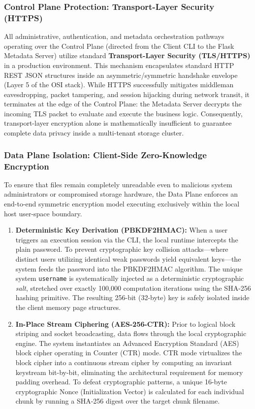 \subsubsection{Control Plane Protection: Transport-Layer Security (HTTPS)}
All administrative, authentication, and metadata orchestration pathways operating over the Control Plane (directed from the Client CLI to the Flask Metadata Server) utilize standard \textbf{Transport-Layer Security (TLS/HTTPS)} in a production environment. This mechanism encapsulates standard HTTP REST JSON structures inside an asymmetric/symmetric handshake envelope (Layer 5 of the OSI stack). While HTTPS successfully mitigates middleman eavesdropping, packet tampering, and session hijacking during network transit, it terminates at the edge of the Control Plane: the Metadata Server decrypts the incoming TLS packet to evaluate and execute the business logic. Consequently, transport-layer encryption alone is mathematically insufficient to guarantee complete data privacy inside a multi-tenant storage cluster.

\subsubsection{Data Plane Isolation: Client-Side Zero-Knowledge Encryption}
To ensure that files remain completely unreadable even to malicious system administrators or compromised storage hardware, the Data Plane enforces an end-to-end symmetric encryption model executing exclusively within the local host user-space boundary.
\begin{enumerate}
    \item \textbf{Deterministic Key Derivation (PBKDF2HMAC):} When a user triggers an execution session via the CLI, the local runtime intercepts the plain password. To prevent cryptographic key collision attacks—where distinct users utilizing identical weak passwords yield equivalent keys—the system feeds the password into the PBKDF2HMAC algorithm. The unique system \texttt{username} is systematically injected as a deterministic cryptographic \textit{salt}, stretched over exactly 100,000 computation iterations using the SHA-256 hashing primitive. The resulting 256-bit (32-byte) key is safely isolated inside the client memory page structures.
    \item \textbf{In-Place Stream Ciphering (AES-256-CTR):} Prior to logical block striping and socket broadcasting, data flows through the local cryptographic engine. The system instantiates an Advanced Encryption Standard (AES) block cipher operating in Counter (CTR) mode. CTR mode virtualizes the block cipher into a continuous stream cipher by computing an invariant keystream bit-by-bit, eliminating the architectural requirement for memory padding overhead. To defeat cryptographic patterns, a unique 16-byte cryptographic Nonce (Initialization Vector) is calculated for each individual chunk by running a SHA-256 digest over the target chunk filename.
\end{enumerate}

